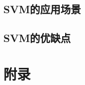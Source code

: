 \documentclass[a4paper,UTF8]{ctexart}
\theoremstyle{plain} \newtheorem{theorem}{定理}[section]
\theoremstyle{plain} \newtheorem{definition}{定义}[section]
\theoremstyle{plain} \newtheorem{lemma}{引理}[section]
\theoremstyle{plain} \newtheorem{proposition}{命题}[section]
\theoremstyle{plain} \newtheorem{example}{例}
\theoremstyle{plain} \newtheorem{remark}{注}
\theoremstyle{plain} \newtheorem{corollary}{推论}[section]
\begin{document}
\subsection{SVM的应用场景}





\subsection{SVM的优缺点}




\newpage

\section*{附录}
\end{document}
